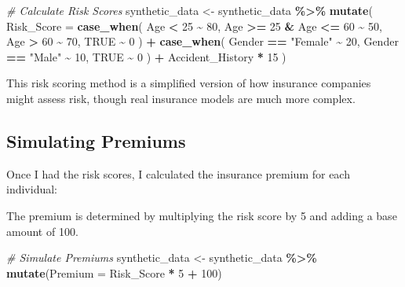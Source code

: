 \documentclass[
]{article}
\newenvironment{Shaded}{\begin{snugshade}}{\end{snugshade}}
\newcommand{\AttributeTok}[1]{\textcolor[rgb]{0.13,0.29,0.53}{#1}}
\newcommand{\CommentTok}[1]{\textcolor[rgb]{0.56,0.35,0.01}{\textit{#1}}}
\newcommand{\ConstantTok}[1]{\textcolor[rgb]{0.56,0.35,0.01}{#1}}
\newcommand{\DecValTok}[1]{\textcolor[rgb]{0.00,0.00,0.81}{#1}}
\newcommand{\FunctionTok}[1]{\textcolor[rgb]{0.13,0.29,0.53}{\textbf{#1}}}
\newcommand{\NormalTok}[1]{#1}
\newcommand{\OtherTok}[1]{\textcolor[rgb]{0.56,0.35,0.01}{#1}}
\newcommand{\SpecialCharTok}[1]{\textcolor[rgb]{0.81,0.36,0.00}{\textbf{#1}}}
\newcommand{\StringTok}[1]{\textcolor[rgb]{0.31,0.60,0.02}{#1}}
\begin{document}
\begin{Shaded}
\begin{Highlighting}[]
\CommentTok{\# Calculate Risk Scores}
\NormalTok{synthetic\_data }\OtherTok{\textless{}{-}}\NormalTok{ synthetic\_data }\SpecialCharTok{\%\textgreater{}\%}
  \FunctionTok{mutate}\NormalTok{(}
    \AttributeTok{Risk\_Score =} \FunctionTok{case\_when}\NormalTok{(}
\NormalTok{      Age }\SpecialCharTok{\textless{}} \DecValTok{25} \SpecialCharTok{\textasciitilde{}} \DecValTok{80}\NormalTok{,}
\NormalTok{      Age }\SpecialCharTok{\textgreater{}=} \DecValTok{25} \SpecialCharTok{\&}\NormalTok{ Age }\SpecialCharTok{\textless{}=} \DecValTok{60} \SpecialCharTok{\textasciitilde{}} \DecValTok{50}\NormalTok{,}
\NormalTok{      Age }\SpecialCharTok{\textgreater{}} \DecValTok{60} \SpecialCharTok{\textasciitilde{}} \DecValTok{70}\NormalTok{,}
      \ConstantTok{TRUE} \SpecialCharTok{\textasciitilde{}} \DecValTok{0}
\NormalTok{    ) }\SpecialCharTok{+} \FunctionTok{case\_when}\NormalTok{(}
\NormalTok{      Gender }\SpecialCharTok{==} \StringTok{"Female"} \SpecialCharTok{\textasciitilde{}} \DecValTok{20}\NormalTok{,}
\NormalTok{      Gender }\SpecialCharTok{==} \StringTok{"Male"} \SpecialCharTok{\textasciitilde{}} \DecValTok{10}\NormalTok{,}
      \ConstantTok{TRUE} \SpecialCharTok{\textasciitilde{}} \DecValTok{0}
\NormalTok{    ) }\SpecialCharTok{+}\NormalTok{ Accident\_History }\SpecialCharTok{*} \DecValTok{15}
\NormalTok{  )}
\end{Highlighting}
\end{Shaded}

This risk scoring method is a simplified version of how insurance
companies might assess risk, though real insurance models are much more
complex.

\subsection{Simulating Premiums}\label{simulating-premiums}

Once I had the risk scores, I calculated the insurance premium for each
individual:

The premium is determined by multiplying the risk score by 5 and adding
a base amount of 100.

\begin{Shaded}
\begin{Highlighting}[]
\CommentTok{\# Simulate Premiums}
\NormalTok{synthetic\_data }\OtherTok{\textless{}{-}}\NormalTok{ synthetic\_data }\SpecialCharTok{\%\textgreater{}\%}
  \FunctionTok{mutate}\NormalTok{(}\AttributeTok{Premium =}\NormalTok{ Risk\_Score }\SpecialCharTok{*} \DecValTok{5} \SpecialCharTok{+} \DecValTok{100}\NormalTok{)}
\end{Highlighting}
\end{Shaded}
\end{document}
